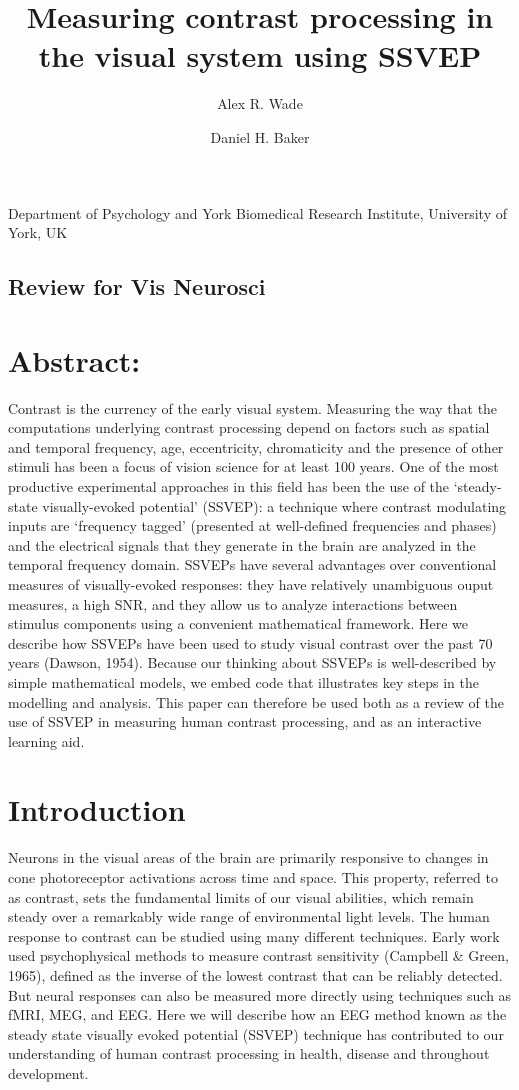 \documentclass[
  letterpaper,
  DIV=11,
  numbers=noendperiod]{scrartcl}
\title{Measuring contrast processing in the visual system using SSVEP}
\author{Alex R. Wade \and Daniel H. Baker}
\date{}
\begin{document}
\maketitle

Department of Psychology and York Biomedical Research Institute,
University of York, UK

\subsection{Review for Vis Neurosci}\label{review-for-vis-neurosci}

\section{Abstract:}\label{abstract}

Contrast is the currency of the early visual system. Measuring the way
that the computations underlying contrast processing depend on factors
such as spatial and temporal frequency, age, eccentricity, chromaticity
and the presence of other stimuli has been a focus of vision science for
at least 100 years. One of the most productive experimental approaches
in this field has been the use of the `steady-state visually-evoked
potential' (SSVEP): a technique where contrast modulating inputs are
`frequency tagged' (presented at well-defined frequencies and phases)
and the electrical signals that they generate in the brain are analyzed
in the temporal frequency domain. SSVEPs have several advantages over
conventional measures of visually-evoked responses: they have relatively
unambiguous ouput measures, a high SNR, and they allow us to analyze
interactions between stimulus components using a convenient mathematical
framework. Here we describe how SSVEPs have been used to study visual
contrast over the past 70 years (Dawson, 1954). Because our thinking
about SSVEPs is well-described by simple mathematical models, we embed
code that illustrates key steps in the modelling and analysis. This
paper can therefore be used both as a review of the use of SSVEP in
measuring human contrast processing, and as an interactive learning aid.

\section{Introduction}\label{introduction}

Neurons in the visual areas of the brain are primarily responsive to
changes in cone photoreceptor activations across time and space. This
property, referred to as contrast, sets the fundamental limits of our
visual abilities, which remain steady over a remarkably wide range of
environmental light levels. The human response to contrast can be
studied using many different techniques. Early work used psychophysical
methods to measure contrast sensitivity (Campbell \& Green, 1965),
defined as the inverse of the lowest contrast that can be reliably
detected. But neural responses can also be measured more directly using
techniques such as fMRI, MEG, and EEG. Here we will describe how an EEG
method known as the steady state visually evoked potential (SSVEP)
technique has contributed to our understanding of human contrast
processing in health, disease and throughout development.
\end{document}
